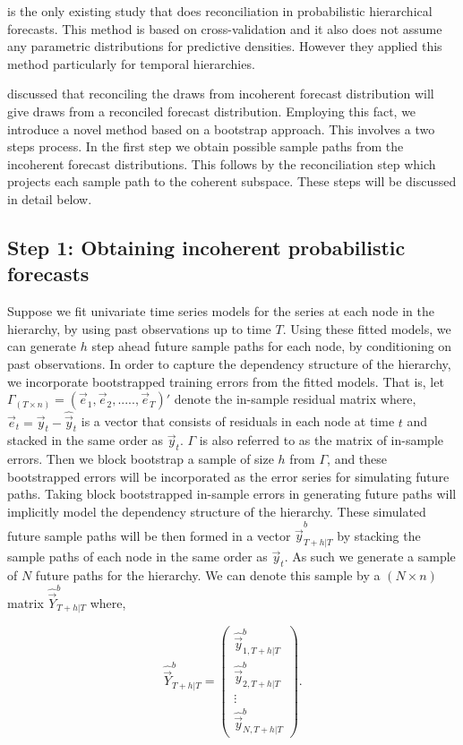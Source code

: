 \documentclass[graybox]{svmult}
\begin{document}
\cite{Jeon2018} is the only existing study that does reconciliation in probabilistic hierarchical forecasts. This method is based on cross-validation and it also does not assume any parametric distributions for predictive densities. However they applied this method particularly for temporal hierarchies.

\cite{Gamakumara2018} discussed that reconciling the draws from incoherent forecast distribution will give draws from a reconciled forecast distribution. Employing this fact, we introduce a novel method based on a bootstrap approach. This involves a two steps process. In the first step we obtain possible sample paths from the incoherent forecast distributions. This follows by the reconciliation step which projects each sample path to the coherent subspace. These steps will be discussed in detail below.

\subsection*{Step 1: Obtaining incoherent probabilistic forecasts}

Suppose we fit univariate time series models for the series at each node in the hierarchy, by using past observations up to time $T$. Using these fitted models, we can generate $h$ step ahead future sample paths for each node, by conditioning on past observations. In order to capture the dependency structure of the hierarchy, we incorporate bootstrapped training errors from the fitted models. That is, let $\varGamma_{(T \times n)}=(\vec{e}_1,\vec{e}_2,.....,\vec{e}_T)'$ denote the in-sample residual matrix where, $\vec{e}_t=\vec{y}_t-\hat{\vec{y}}_t$ is a vector that consists of residuals in each node at time $t$ and stacked in the same order as $\vec{y}_t$. $\varGamma$ is also referred to as the matrix of in-sample errors. Then we block bootstrap a sample of size $h$ from $\varGamma$, and these bootstrapped errors will be incorporated as the error series for simulating future paths. Taking block bootstrapped in-sample errors in generating future paths will implicitly model the dependency structure of the hierarchy. These simulated future sample paths will be then formed in a vector $\hat{\vec{y}}_{T+h|T}^b$ by stacking the sample paths of each node in the same order as $\vec{y}_t$. As such we generate a sample of $N$ future paths for the hierarchy. We can denote this sample by a $(N \times n)$ matrix $\hat{\vec{Y}}^b_{T+h|T}$ where,

\begin{equation} \label{eq:19}
\hat{\vec{Y}}^b_{T+h|T}=\begin{pmatrix}
\hat{\vec{y}}_{1,T+h|T}^b\\
\hat{\vec{y}}_{2,T+h|T}^b\\
\vdots\\
\hat{\vec{y}}_{N,T+h|T}^b
\end{pmatrix}.
\end{equation}
\end{document}
